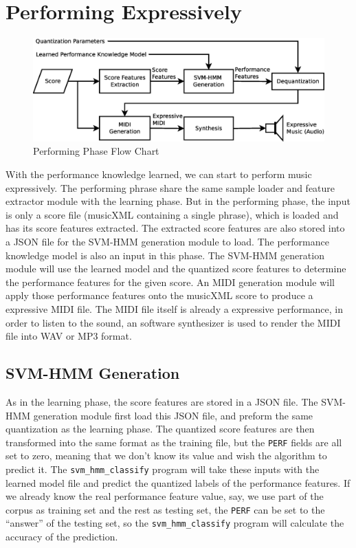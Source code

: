    \section{Performing Expressively}
   \begin{figure}[tp]
      \begin{center}
         \includegraphics[width=\textwidth]{fig/perf_arch}
      \end{center}
      \caption{Performing Phase Flow Chart} 
      \label{fig:perfflow}
   \end{figure}
With the performance knowledge learned, we can start to perform music expressively. The performing phrase share the same sample loader and feature extractor module with the learning phase. But in the performing phase, the input is only a score file (musicXML containing a single phrase), which is loaded and has its score features extracted. The extracted score features are also stored into a JSON file for the SVM-HMM generation module to load. The performance knowledge model is also an input in this phase. The SVM-HMM generation module will use the learned model and the quantized score features to determine the performance features for the given score. An MIDI generation module will apply those performance features onto the musicXML score to produce a expressive MIDI file. The MIDI file itself is already a expressive performance, in order to listen to the sound, an software synthesizer is used to render the MIDI file into WAV or MP3 format.
\subsection{SVM-HMM Generation}
As in the learning phase, the score features are stored in a JSON file. The SVM-HMM generation module first load this JSON file, and preform the same quantization as the learning phase. The quantized score features are then transformed into the same format as the training file, but the \texttt{PERF} fields are all set to zero, meaning that we don't know its value and wish the algorithm to predict it. The \texttt{svm\_hmm\_classify} program will take these inputs with the learned model file and predict the quantized labels of the performance features. If we already know the real performance feature value, say, we use part of the corpus as training set and the rest as testing set, the \texttt{PERF} can be set to the \enquote{answer} of the testing set, so the \texttt{svm\_hmm\_classify} program will calculate the accuracy of the prediction. 


